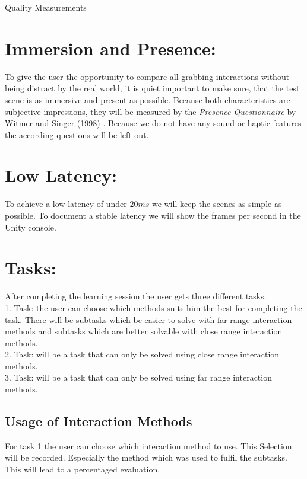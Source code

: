 \documentclass[a4paper, 12pt]{article}
\newcommand{\changefont}[3]{
\fontfamily{#1} \fontseries{#2} \fontshape{#3} \selectfont}
\begin{document}


\newpage

\LARGE{Quality Measurements}
\section {Immersion and Presence:} 
\small To give the user the opportunity to compare all grabbing interactions without being distract by the real world, it is quiet important to make sure, that the test scene is as immersive and present as possible. Because both characteristics are subjective impressions, they will be measured by the \textit{Presence Questionnaire} by Witmer and Singer (1998) \cite{witmer1998measuring}. Because we do not have any sound or haptic features the according questions will be left out. 

\section {Low Latency: }
To achieve a low latency of under $20 ms$ we will keep the scenes as simple as possible. To document a stable latency we will show the frames per second in the Unity console. 

\section {Tasks: }
After completing the learning session the user gets three different tasks. \\
 1. Task: the user can choose which methods suits him the best for completing the task. There will be subtasks which be easier to solve with far range interaction methods and subtasks which are better solvable with close range interaction methods. \\
 2. Task: will be a task that can only be solved using close range interaction methods. \\
 3. Task: will be a task that can only be solved using far range interaction methods. 


\subsection{Usage of Interaction Methods}
For task 1 the user can choose which interaction method to use. This Selection will be recorded. Especially the method which was used to fulfil the subtasks. This will lead to a percentaged evaluation. 
\end{document}
